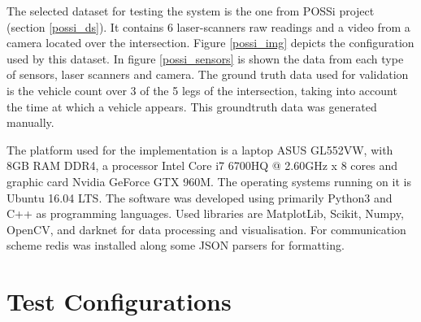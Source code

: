 The selected dataset for testing the system is the one from POSSi project (section \ref{possi_ds}). It contains 6 laser-scanners raw readings and a video from a camera located over the intersection. Figure \ref{possi_img} depicts the configuration used by this dataset. In figure \ref{possi_sensors} is shown the data from each type of sensors, laser scanners and camera. The ground truth data used for validation is the vehicle count over 3 of the 5 legs of the intersection, taking into account the time at which a vehicle appears. This groundtruth data was generated manually.

 

The platform used for the implementation is a laptop ASUS GL552VW, with 8GB RAM DDR4, a processor Intel Core i7 6700HQ @ 2.60GHz x 8 cores and graphic card Nvidia GeForce GTX 960M. The operating systems running on it is Ubuntu 16.04 LTS. The software was developed using primarily Python3 and C++ as programming languages. Used libraries are MatplotLib, Scikit, Numpy, OpenCV, and darknet for data processing and visualisation. For communication scheme redis was installed along some JSON parsers for formatting.

\section{Test Configurations}

